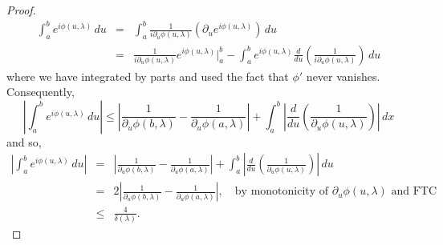 \documentclass[11pt, letter]{book}
\newcommand{\lp}{\left(}
\newcommand{\rp}{\right)}
\newcommand{\p}{\partial}
\newcommand{\f}[2]{\frac{#1}{#2}}
\begin{document}
\begin{proof}
\begin{eqnarray*}
    \int_{a}^b e^{i \phi(u,\lambda)}\,du  
    &=& \int_{a}^b   \f{1}{i \p_u\phi(u, \lambda)}\lp \p_u e^{i \phi(u,\lambda)}\rp   \,du \\
    &=& \f{1}{i \p_u \phi(u,\lambda)}e^{i \phi(u,\lambda)}\bigg\vert_{a}^b 
    - \int_{a}^b  e^{i \phi(u,\lambda)} \f{d}{du}\lp \f{1}{i \p_u \phi(u,\lambda)} \rp \,du 
\end{eqnarray*}
where we have integrated by parts and used the fact that $\phi'$ never vanishes. Consequently,
\begin{equation*}
    \left|\int_a^b e^{i\phi(u,\lambda)}\,du \right|\leq \left|\frac{1}{\p_u \phi(b,\lambda)}-\frac{1}{\p_u \phi(a,\lambda)}\right|+\int_a^b\left|\frac{d}{du}\left(\frac{1}{\p_u \phi(u,\lambda)}\right)\right|\,dx
\end{equation*}
and so,
\begin{eqnarray*}
    \left|\int_a^b e^{i\phi(u,\lambda)}\,du \right|
    &=&\left|\frac{1}{\p_u \phi(b,\lambda)}-\frac{1}{\p_u \phi(a,\lambda)}\right|+\int_a^b\left|\frac{d}{du}\left(\frac{1}{\p_u \phi(u,\lambda)}\right)\right|\,du \\
    &=& 2\left|\frac{1}{\p_u \phi(b,\lambda)}-\frac{1}{\p_u \phi(a,\lambda)}\right|, \quad \mbox{by monotonicity of $\p_u \phi(u,\lambda)$ and FTC} \\
    &\leq& \f{4}{\delta(\lambda)}.
\end{eqnarray*}
\end{proof}
\end{document}
